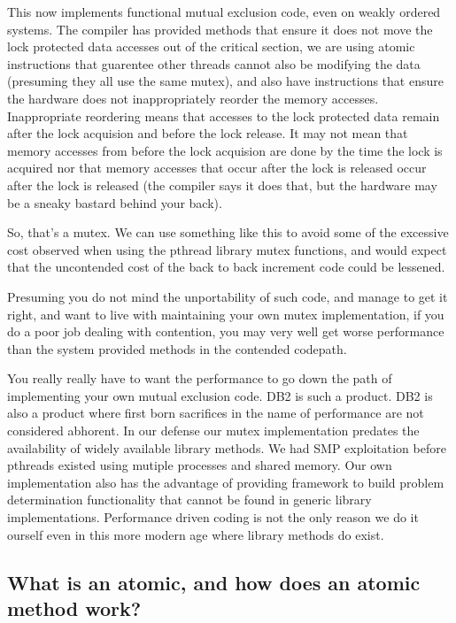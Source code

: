 This now implements functional mutual exclusion code, even on weakly ordered systems.  The compiler has provided methods that ensure it does not move the lock protected data accesses out of the critical section, we are using atomic instructions that guarentee other threads cannot also be modifying the data (presuming they all use the same mutex), and also have instructions that ensure the hardware does not inappropriately reorder the memory accesses.  Inappropriate reordering means that accesses to the lock protected data remain after the lock acquision and before the lock release.  It may not mean that memory accesses from before the lock acquision are done by the time the lock is acquired nor that memory accesses that occur after the lock is released occur after the lock is released (the compiler says it does that, but the hardware may be a sneaky bastard behind your back).

So, that's a mutex.  We can use something like this to avoid some of the excessive cost observed when using the pthread library mutex functions, and would expect that the uncontended cost of the back to back increment code could be lessened.

Presuming you do not mind the unportability of such code, and manage to get it right, and want to live with maintaining your own mutex implementation, if you do a poor job dealing with contention, you may very well get worse performance than the system provided methods in the contended codepath.

You really really have to want the performance to go down the path of implementing your own mutual exclusion code.  DB2 is such a product.  DB2 is also a product where first born sacrifices in the name of performance are not considered abhorent.  In our defense our mutex implementation predates the availability of widely available library methods.  We had SMP exploitation before pthreads existed using mutiple processes and shared memory.  Our own implementation also has the advantage of providing framework to build problem determination functionality that cannot be found in generic library implementations.  Performance driven coding is not the only reason we do it ourself even in this more modern age where library methods do exist.

\subsection{What is an atomic, and how does an atomic method work?}

